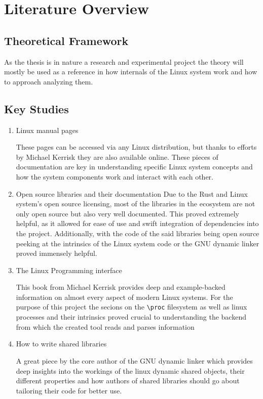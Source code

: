 \chapter{Literature Overview}
\label{cha:lit_overview}

\section{Theoretical Framework}

As the thesis is in nature a research and experimental project the theory will mostly be used as a reference in how internals of the Linux system work and how to approach analyzing them.

\section{Key Studies}

\begin{enumerate}
    \item{Linux manual pages}

    These pages can be accessed via any Linux distribution, but thanks to efforts by Michael Kerrisk they are also available online.
    These pieces of documentation are key in understanding specific Linux system concepts and how the system components work and interact with each other.

    \item Open source libraries and their documentation Due to the Rust and Linux system's open source licensing, most of the libraries in the ecosystem are not only open source but also very well documented.
    This proved extremely helpful, as it allowed for ease of use and swift integration of dependencies into the project.
    Additionally, with the code of the said libraries being open source peeking at the intrinsics of the Linux system code or the GNU dynamic linker \cite{noauthor_sourcewareorg_nodate} proved immensely helpful.

    \item The Linux Programming interface \cite{kerrisk_linux_2010}

    This book from Michael Kerrisk provides deep and example-backed information on almost every aspect of modern Linux systems.
    For the purpose of this project the secions on the \verb|\proc| filesystem as well as linux processes and their intrinsics proved crucial to understanding the backend from which the created tool reads and parses information

    \item How to write shared libraries \cite{drepper_how_2011}

    A great piece by the core author of the GNU dynamic linker which provides deep insights into the workings of the linux dynamic shared objects, their different properties and how authors of shared libraries should go about tailoring their code for better use.
    
\end{enumerate}

